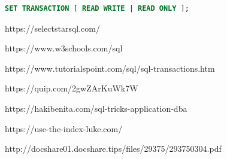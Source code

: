 \documentclass{article}
\begin{document}
\vspace{8pt} \begin{lstlisting}[language=SQL]
SET TRANSACTION [ READ WRITE | READ ONLY ];
\end{lstlisting} \vspace{8pt}




\begin{thebibliography}{}

\bibitem[]{}
https://selectstarsql.com/

\bibitem[]{}
https://www.w3schools.com/sql

\bibitem[]{}
https://www.tutorialspoint.com/sql/sql-transactions.htm

\bibitem[]{}
https://quip.com/2gwZArKuWk7W

\bibitem[]{}
https://hakibenita.com/sql-tricks-application-dba

\bibitem[]{}
https://use-the-index-luke.com/

http://docshare01.docshare.tips/files/29375/293750304.pdf

\end{thebibliography}
\end{document}
